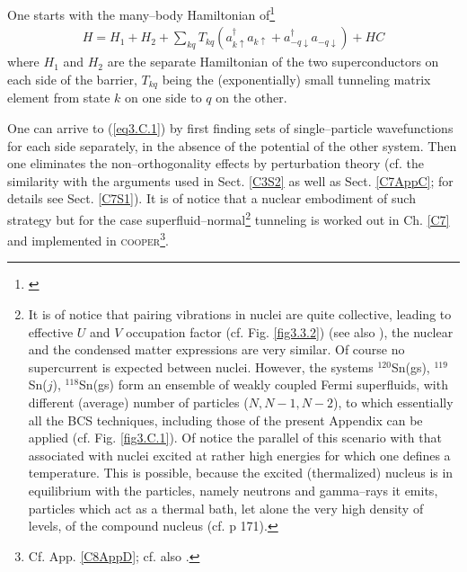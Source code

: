One starts with the many--body Hamiltonian of\footnote{\cite{Cohen:62}}
\begin{align}\label{eq3.C.1}
H=H_1+H_2+\sum_{kq}T_{kq}(a_{k\uparrow}^\dagger a_{k\uparrow}+a_{-q\downarrow}^\dagger a_{-q\downarrow})+HC
\end{align}
where $H_1$ and $H_2$ are the separate Hamiltonian of the two superconductors on each side of the barrier, $T_{kq}$ being the (exponentially) small tunneling matrix element from state $k$ on one side to $q$ on the other.


One can arrive to  (\ref{eq3.C.1}) by first finding sets of single--particle wavefunctions for each side separately, in the absence of the potential of the other system. Then one eliminates the non--orthogonality effects by perturbation theory (cf. the similarity with the arguments used in Sect. \ref{C3S2} as well as Sect. \ref{C7AppC}; for details see Sect. \ref{C7S1}). It is of notice that a nuclear embodiment of such strategy but for the case superfluid--normal\footnote{It is of notice that pairing vibrations in nuclei are quite collective, leading to effective $U$ and $V$ occupation factor (cf. Fig. \ref{fig3.3.2}) (see also \cite{Potel:13b}), the nuclear and the condensed matter expressions are very similar. Of course no supercurrent is expected between nuclei. However, the systems $^{120}$Sn(gs), $^{119}$Sn($j$), $^{118}$Sn(gs) form an ensemble of weakly coupled Fermi superfluids, with different (average) number of particles ($N,N-1,N-2$), to which essentially all the BCS techniques, including those of the present Appendix can be applied (cf. Fig. \ref{fig3.C.1}). Of notice the parallel of this scenario with that associated with nuclei excited at rather high energies for which one defines a temperature. This is possible, because the excited (thermalized) nucleus is in equilibrium with the particles, namely neutrons and gamma--rays it emits, particles which act as a thermal bath, let alone the very high density of levels, of the compound nucleus (cf. \cite{Bertsch:05} p 171).} tunneling is worked out in Ch. \ref{C7} and implemented in \textsc{cooper}\footnote{Cf. App. \ref{C8AppD}; cf. also \cite{Broglia:04a}.}.


